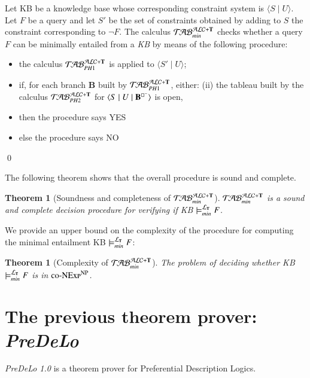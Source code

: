 \documentclass[a4paper, 11pt, oneside]{elsarticle}
\newcommand{\tip}{{\bf T}}
\newcommand{\nott} {\lnot}
\newcommand{\tc} {\mid}
\newcommand{\bbox}{\square}
\newcommand{\sx} {\langle}
\newcommand{\dx} {\rangle}
\newcommand{\ellet} {\mathcal{L}_{\bf T}}
\newcommand{\nuovoc}{\mathrel{{\mathcal{T}\!\mathcal{AB}}}_{min}^{\mathcal{ALC}+\mbox{\scriptsize $\tip$}}}
\newcommand{\primo}{\mathrel{{\mathcal{T}\!\mathcal{AB}}}_{PH 1}^{\mathcal{ALC}+\mbox{\scriptsize $\tip$}}}
\newcommand{\secondo}{\mathrel{{\mathcal{T}\!\mathcal{AB}}}_{PH 2}^{\mathcal{ALC}+\mbox{\scriptsize $\tip$}}}
\newenvironment{definition}
{\begin{defi} \rm}{\qed \end{defi}}
\newtheorem{theorem}{Theorem}
\newcounter{posu}
\newtheorem{theorem}[posu]{Theorem}
\newtheorem{definition}[posu]{Definition}
\begin{document}
\begin{definition}\label{def processo}
Let KB be a knowledge base whose corresponding constraint system is $\sx S \tc U \dx$. Let $F$ be a query and let $S'$ be the set of constraints obtained by adding to $S$ the constraint corresponding to $\nott F$.
The calculus $\nuovoc$ checks whether a query $F$ can be minimally entailed from a \emph{KB} by means of the following procedure:
\begin{itemize}
\item the calculus $\primo$ is applied to $\sx S' \tc U \dx$;
\item if, for each branch {\bf B} built by $\primo$, either:
	\subitem(ii) {the tableau built by the calculus $\secondo$ for $\sx S \tc U \tc {\bf
B}^{\bbox^{-}} \dx$ is open, }
\item[] then the procedure says \textsc{YES}
\item[] else the procedure says \textsc{NO}
\end{itemize}
\end{definition}

\noindent The following theorem shows that the overall procedure is sound and complete.

\begin{theorem}[Soundness and completeness of $\nuovoc$]\label{Soundness e completeness nuovoc} $\nuovoc$ is  a sound and complete decision procedure for verifying if KB $\models_{min}^{\ellet} F$.
\end{theorem}

We provide an upper bound on the complexity of the procedure for computing the minimal entailment KB $\models_{min}^{\ellet} F$:

\begin{theorem}[Complexity of $\nuovoc$]\label{overall_complexity}
The problem of deciding whether \emph{KB} $\models_{min}^{\ellet} F$ is in $\textsc{co-NExp}^\textsc{NP}$.
\end{theorem}


\newpage


\section{The previous theorem prover: \emph{PreDeLo}}\label{predelo} \emph{PreDeLo 1.0} is a theorem prover for Preferential Description Logics.
\end{document}
